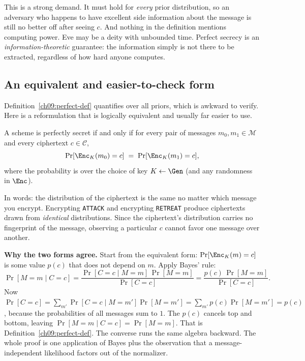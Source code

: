This is a strong demand. It must hold for \emph{every} prior distribution, so an adversary who happens to have excellent side information about the message is still no better off after seeing $c$. And nothing in the definition mentions computing power. Eve may be a deity with unbounded time. Perfect secrecy is an \emph{information-theoretic} guarantee: the information simply is not there to be extracted, regardless of how hard anyone computes.

\subsection{An equivalent and easier-to-check form}
\label{ch09:equiv}

Definition~\ref{ch09:perfect-def} quantifies over all priors, which is awkward to verify. Here is a reformulation that is logically equivalent and usually far easier to use.

\begin{lemma}
\label{ch09:equiv-lemma}
A scheme is perfectly secret if and only if for every pair of messages $m_0, m_1 \in \mathcal{M}$ and every ciphertext $c \in \mathcal{C}$,
\[
  \Pr[\Enc_K(m_0) = c] \;=\; \Pr[\Enc_K(m_1) = c],
\]
where the probability is over the choice of key $K \gets \Gen$ (and any randomness in $\Enc$).
\end{lemma}

In words: the distribution of the ciphertext is the same no matter which message you encrypt. Encrypting \texttt{ATTACK} and encrypting \texttt{RETREAT} produce ciphertexts drawn from \emph{identical} distributions. Since the ciphertext's distribution carries no fingerprint of the message, observing a particular $c$ cannot favor one message over another.

\begin{whybox}
\textbf{Why the two forms agree.} Start from the equivalent form: $\Pr[\Enc_K(m) = c]$ is some value $p(c)$ that does not depend on $m$. Apply Bayes' rule:
\[
  \Pr[M=m \mid C=c] = \frac{\Pr[C=c \mid M=m]\,\Pr[M=m]}{\Pr[C=c]}
  = \frac{p(c)\,\Pr[M=m]}{\Pr[C=c]}.
\]
Now $\Pr[C=c] = \sum_{m'} \Pr[C=c \mid M=m']\Pr[M=m'] = \sum_{m'} p(c)\Pr[M=m'] = p(c)$, because the probabilities of all messages sum to $1$. The $p(c)$ cancels top and bottom, leaving $\Pr[M=m\mid C=c] = \Pr[M=m]$. That is Definition~\ref{ch09:perfect-def}. The converse runs the same algebra backward. The whole proof is one application of Bayes plus the observation that a message-independent likelihood factors out of the normalizer.
\end{whybox}

